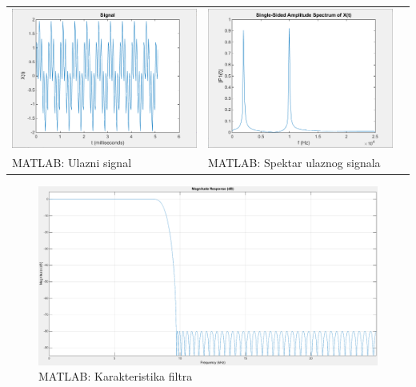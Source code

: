 \documentclass[a4paper,12pt, projekat]{etf}
\begin{document}
\begin{table}[h!]
	\begin{tabular}{lll}
		\includegraphics[scale=0.4]{matlab_raw.png} &
		\includegraphics[scale=0.4]{matlab_raw_spec.png} \\
		MATLAB: Ulazni signal &
		MATLAB: Spektar ulaznog signala
	\end{tabular}
\end{table}

\begin{figure}[htb]
	\centering
	\includegraphics[scale=0.3]{matlab_filter.png}
	\caption{MATLAB: Karakteristika filtra}
	\label{fig:matlabFilter}
\end{figure}
\end{document}
